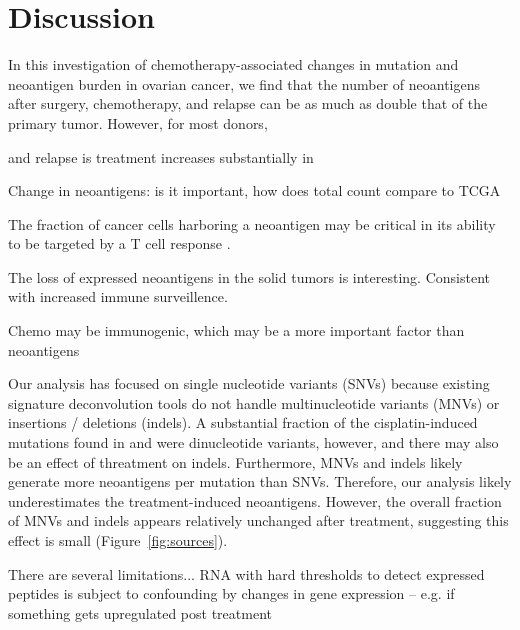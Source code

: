 \section*{Discussion}

In this investigation of chemotherapy-associated changes in mutation and neoantigen burden in ovarian cancer, we find that the number of neoantigens after surgery, chemotherapy, and relapse can be as much as double that of the primary tumor. However, for most donors, 

and relapse is  treatment increases substantially in  

Change in neoantigens: is it important, how does total count compare to TCGA

The fraction of cancer cells harboring a neoantigen may be critical in its ability to be targeted by a T cell response \cite{McGranahan_2016}.

The loss of expressed neoantigens in the solid tumors is interesting. Consistent with increased immune surveillence.

Chemo may be immunogenic, which may be a more important factor than neoantigens

Our analysis has focused on single nucleotide variants (SNVs) because existing signature deconvolution tools do not handle multinucleotide variants (MNVs) or insertions / deletions (indels). A substantial fraction of the cisplatin-induced mutations found in \cite{Meier_2014} and \cite{Szikriszt_2016} were dinucleotide variants, however, and there may also be an effect of threatment on indels. Furthermore, MNVs and indels likely generate more neoantigens per mutation than SNVs. Therefore, our analysis likely underestimates the treatment-induced neoantigens. However, the overall fraction of MNVs and indels appears relatively unchanged after treatment, suggesting this effect is small (Figure~\ref{fig:sources}).

There are several limitations... RNA with hard thresholds to detect expressed peptides is subject to confounding by changes in gene expression -- e.g. if something gets upregulated post treatment